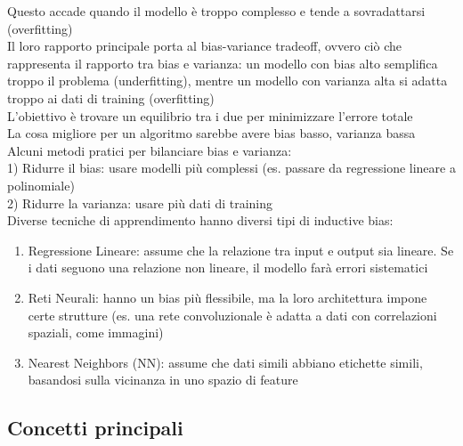 \documentclass[10pt,oneside,a4paper]{article}
\begin{document}
Questo accade quando il modello è troppo complesso e tende a sovradattarsi (overfitting)\\
Il loro rapporto principale porta al bias-variance tradeoff, ovvero ciò che rappresenta il rapporto tra bias e varianza: un modello con bias alto semplifica troppo il problema (underfitting), mentre un modello con varianza alta si adatta troppo ai dati di training (overfitting)\\
L'obiettivo è trovare un equilibrio tra i due per minimizzare l'errore totale\\
La cosa migliore per un algoritmo sarebbe avere bias basso, varianza bassa\\
Alcuni metodi pratici per bilanciare bias e varianza:\\
1) Ridurre il bias: usare modelli più complessi (es. passare da regressione lineare a polinomiale)\\
2) Ridurre la varianza: usare più dati di training\\
Diverse tecniche di apprendimento hanno diversi tipi di inductive bias:\\
\begin{enumerate}
	\item Regressione Lineare: assume che la relazione tra input e output sia lineare. Se i dati seguono una relazione non lineare, il modello farà errori sistematici
	\item Reti Neurali: hanno un bias più flessibile, ma la loro architettura impone certe strutture (es. una rete convoluzionale è adatta a dati con correlazioni spaziali, come immagini)
	\item Nearest Neighbors (NN): assume che dati simili abbiano etichette simili, basandosi sulla vicinanza in uno spazio di feature
\end{enumerate}


\subsection{Concetti principali}
\end{document}
